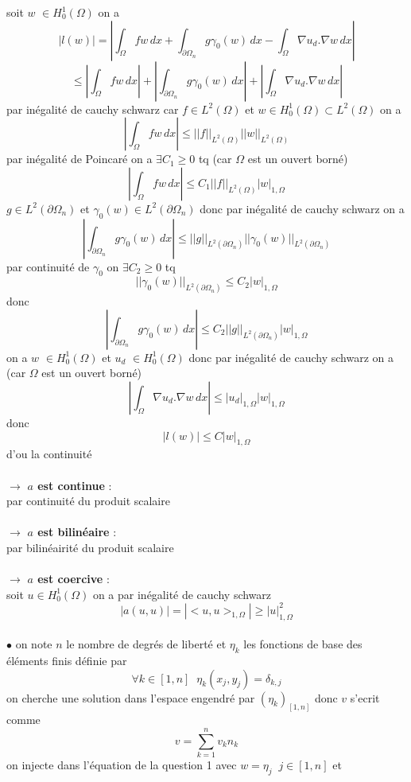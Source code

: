 \documentclass{article}
\begin{document}
soit $w$ $\in H_{0}^{1}(\Omega)$ on a 
$$
|l(w)| = |\int_{\Omega} f w \,dx + \int_{\partial \Omega_{n}} g \gamma_{0}(w) \,dx - \int_{\Omega} \nabla u_d . \nabla w \,dx|
$$
$$
\leq |\int_{\Omega} f w \,dx| + |\int_{\partial \Omega_{n}} g \gamma_{0}(w) \,dx| + |\int_{\Omega} \nabla u_d . \nabla w \,dx|
$$
par inégalité de cauchy schwarz car $f \in L^2(\Omega)$ et $w \in H_{0}^{1}(\Omega) \subset L^2(\Omega)$ on a
$$
|\int_{\Omega} f w \,dx| \leq ||f||_{L^2(\Omega)} ||w||_{L^2(\Omega)} 
$$
par inégalité de Poincaré on a $\exists C_1 \geq 0$ tq (car $\Omega$ est un ouvert borné)
$$
|\int_{\Omega} f w \,dx| \leq C_1 ||f||_{L^2(\Omega)} |w|_{1, \Omega} 
$$
$g \in L^2(\partial \Omega_n)$ et $\gamma_{0}(w) \in L^2(\partial \Omega_n)$ donc par inégalité de cauchy schwarz on a
$$
|\int_{\partial \Omega_{n}} g \gamma_{0}(w) \,dx| \leq ||g||_{L^2(\partial \Omega_n)} ||\gamma_{0}(w)||_{L^2(\partial \Omega_n)}
$$
par continuité de $\gamma_0$ on $\exists C_2 \geq 0$ tq
$$
||\gamma_0(w)||_{L^2(\partial \Omega_n)} \leq C_2 |w|_{1, \Omega}
$$
donc
$$
|\int_{\partial \Omega_{n}} g \gamma_{0}(w) \,dx| \leq C_2 ||g||_{L^2(\partial \Omega_n)} |w|_{1, \Omega}
$$
on a $w$ $\in H_{0}^{1}(\Omega)$ et $u_d$ $\in H_{0}^{1}(\Omega)$ donc par inégalité de cauchy schwarz on a (car $\Omega$ est un ouvert borné)
$$
|\int_{\Omega} \nabla u_d . \nabla w \,dx| \leq |u_d|_{1, \Omega} |w|_{1, \Omega}
$$
donc 
$$
|l(w)| \leq C |w|_{1, \Omega}
$$
d'ou la continuité \\ \\
$\rightarrow$ \textbf{$a$ est continue} : \\
par continuité du produit scalaire \\ \\
$\rightarrow$ \textbf{$a$ est bilinéaire} : \\
par bilinéairité du produit scalaire \\ \\
$\rightarrow$ \textbf{$a$ est coercive} : \\
soit $u \in H_{0}^{1}(\Omega)$ on a par inégalité de cauchy schwarz
$$
|a(u, u)| = |<u, u>_{1, \Omega}| \geq |u|^{2}_{1, \Omega}
$$
\\
$\bullet$ on note $n$ le nombre de degrés de liberté et $\eta_k$ les fonctions de base des éléments finis définie par 
$$
\forall k \in [1, n] \; \; \eta_k(x_j, y_j) = \delta_{k, j} 
$$
on cherche une solution dans l'espace engendré par $(\eta_{k})_{[1, n]}$ donc $v$ s'ecrit comme 
$$
v = \sum_{k=1}^{n} v_k n_k
$$
on injecte dans l'équation de la question 1 avec $w = \eta_j \; \; j \in [1, n]$ et 
\end{document}
